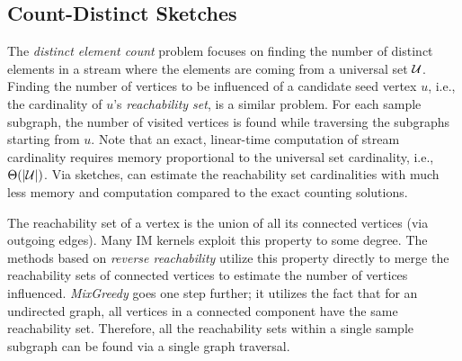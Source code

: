 \documentclass[final,5p,times,twocolumn]{elsarticle}
\newcommand\acro{{\sc{HyperFuseR\xspace}\xspace}\xspace}
\newcommand\kktodo[1]{\textcolor{red}{#1}}
\newcommand\ggx[1]{\textcolor{blue}{#1}}
\begin{document}
\subsection{Count-Distinct Sketches}\label{sec:sketch}


The {\em distinct element count} problem focuses on finding the number of distinct elements in a stream where the elements are coming from a universal set ${\cal U}$. Finding the number of vertices to be influenced of a candidate seed vertex $u$, i.e., the cardinality of $u$'s {\em reachability set}, is a similar problem. For each sample subgraph, the number of visited vertices is found while traversing the subgraphs starting from $u$. Note that an exact, linear-time computation of stream cardinality requires memory proportional to the universal set cardinality, i.e., ${\Theta}(|{\cal U}|)$. Via sketches, \acro can estimate the reachability set cardinalities with much less memory and computation compared to the exact counting solutions. 

The reachability set of a vertex is the union of all its connected vertices (via outgoing edges). Many IM kernels exploit this property to some degree. The methods based on {\em reverse reachability} \cite{borgs2014maximizing} %
utilize this property directly to merge the reachability sets of connected vertices to estimate the number of vertices influenced. {\em MixGreedy} \cite{MixGreedy} %
goes one step further; it utilizes the fact that for an undirected graph, all vertices in a connected component have the same reachability set. Therefore, all the reachability sets within a single sample subgraph can be found via a single graph traversal. 
\end{document}
